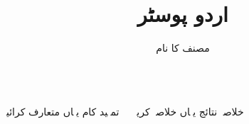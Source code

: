 \documentclass{beamer}
\title{اردو پوسٹر}
\author{مصنف کا نام}
\begin{document}
\begin{frame}
\begin{columns}[t]
  \begin{block}{تمہید}
    کام یہاں متعارف کرائیںؔ
  \end{block}
  \begin{block}{خلاصہ}
    نتائج یہاں خلاصہ کریںؔ
  \end{block}
\end{columns}
\end{frame}
\end{document}
